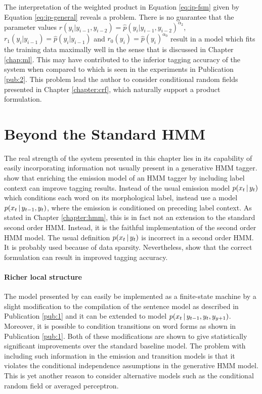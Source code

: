 The interpretation of the weighted product in Equation \ref{eq:ip-fsm}
given by Equation \ref{eq:ip-general} reveals a problem. There is no
guarantee that the parameter values $r(y_i|y_{i-1},y_{i-2}) =
\hat{p}(y_i|y_{i-1},y_{i-2})^{\alpha_2}$, $r_1(y_i|y_{i-1}) =
\hat{p}(y_i|y_{i-1})$ and $r_0(y_i) = \hat{p}(y_i)^{\alpha_0}$ result
in a model which fits the training data maximally well in the sense
that is discussed in Chapter \ref{chap:ml}. This may have contributed
to the inferior tagging accuracy of the system when compared to
\cite{Brants2000} which is seen in the experiments in Publication
\ref{pub:2}. This problem lead the
author to consider conditional random fields presented in Chapter
\ref{chapter:crf}, which naturally support a product formulation.

\section{Beyond the Standard HMM}\label{sec:enriched}

The real strength of the system presented in this chapter lies in its
capability of easily incorporating information not usually present in
a generative HMM tagger. \cite{Halacsy2007} show that enriching the
emission model of an HMM tagger by including label context can improve
tagging results. Instead of the usual emission model $p(x_t\mbox{$ \, | \, $} y_t)$
which conditions each word on its morphological label,
\cite{Halacsy2007} instead use a model $p(x_t\mbox{$ \, | \, $} y_{t-1},y_t)$,
where the emission is conditioned on preceding label context. As
stated in Chapter \ref{chapter:hmm}, this is in fact not an extension
to the standard second order HMM. Instead, it is the faithful
implementation of the second order HMM model. The usual definition
$p(x_t\mbox{$ \, | \, $} y_t)$ is incorrect in a second order HMM. It is probably
used because of data sparsity. Nevertheless, \cite{Halacsy2007} show
that the correct formulation can result in improved tagging accuracy.

\paragraph{Richer local structure} The model presented by
\cite{Halacsy2007} can easily be implemented as a finite-state machine
by a slight modification to the compilation of the sentence model as
described in Publication \ref{pub:1} and it can be extended to model
$p(x_t\mbox{$ \, | \, $} y_{t-1}, y_t, y_{y+1})$. Moreover, it is possible to
condition transitions on word forms as shown in Publication
\ref{pub:1}. Both of these modifications are shown to give
statistically significant improvements over the standard baseline
model. The problem with including such information in the emission and
transition models is that it violates the conditional independence
assumptions in the generative HMM model. This is yet another reason to
consider alternative models such as the conditional random field or
averaged perceptron.

